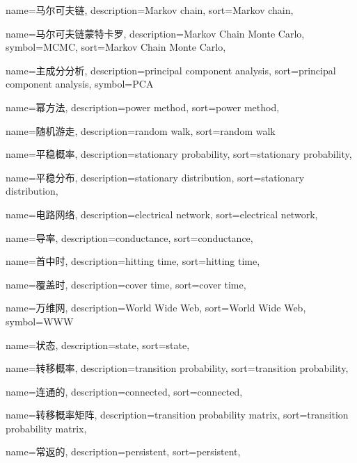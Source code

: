 {
	name=马尔可夫链,
	description={Markov chain},
	sort={Markov chain},
}


{
	name=马尔可夫链蒙特卡罗,
	description={Markov Chain Monte Carlo},
	symbol={MCMC},
	sort={Markov Chain Monte Carlo},
}

{
	name=主成分分析,
	description={principal component analysis},
	sort={principal component analysis},
	symbol={PCA}
}

{
	name=幂方法,
	description={power method},
	sort={power method},
}

{
	name=随机游走,
	description={random walk},
	sort={random walk}
}

{
	name=平稳概率,
	description={stationary probability},
	sort={stationary probability},
}

{
	name=平稳分布,
	description={stationary distribution},
	sort={stationary distribution},
}

{
	name=电路网络,
	description={electrical network},
	sort={electrical network},
}

{
	name=导率,
	description={conductance},
	sort={conductance},
}

{
	name=首中时,
	description={hitting time},
	sort={hitting time},
}

{
	name=覆盖时,
	description={cover time},
	sort={cover time},
}

{
	name=万维网,
	description={World Wide Web},
	sort={World Wide Web},
	symbol={WWW}
}

{
	name=状态,
	description={state},
	sort={state},
}

{
	name=转移概率,
	description={transition probability},
	sort={transition probability},
}

{
	name=连通的,
	description={connected},
	sort={connected},
}

{
	name=转移概率矩阵,
	description={transition probability matrix},
	sort={transition probability matrix},
}

{
	name=常返的,
	description={persistent},
	sort={persistent},
}

